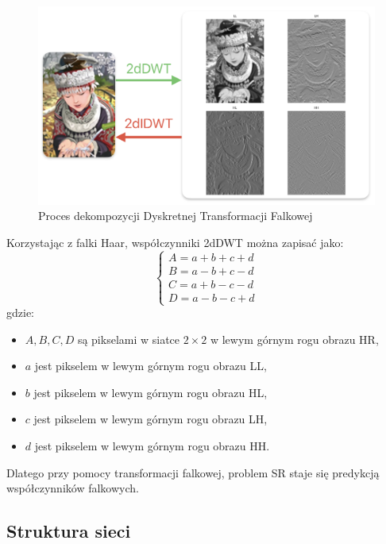 \begin{figure}[ht]
    \centering
    \begin{minipage}[t]{0.7\linewidth}
        \includegraphics[width=\linewidth]{Rozdziały/03.DWSR/Obrazy/konstrukcja_2dDWT.png}  
        \caption{Proces dekompozycji Dyskretnej Transformacji Falkowej}
        \label{fig:image48}
    \end{minipage}
\end{figure}


Korzystając z falki Haar, współczynniki 2dDWT można zapisać jako:
\begin{equation}
    \left\{\begin{array}{l}
    A=a+b+c+d \\
    B=a-b+c-d \\
    C=a+b-c-d \\
    D=a-b-c+d
    \end{array}\right.
\end{equation}
gdzie: 
\begin{itemize}
    \item $A, B, C, D$ są pikselami w siatce $2 \times  2$ w lewym górnym rogu obrazu HR,
    \item $a$ jest pikselem w lewym górnym rogu obrazu LL,
    \item $b$ jest pikselem w lewym górnym rogu obrazu HL,
    \item $c$ jest pikselem w lewym górnym rogu obrazu LH,
    \item $d$ jest pikselem w lewym górnym rogu obrazu HH.
\end{itemize}

Dlatego przy pomocy transformacji falkowej, problem SR staje się predykcją współczynników falkowych.


\newpage
\subsection*{Struktura sieci}

